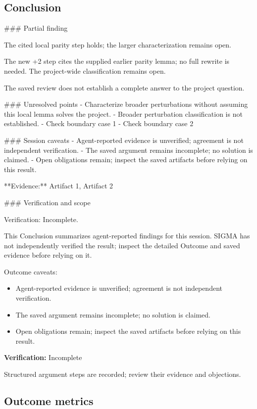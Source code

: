 \documentclass[11pt]{article}
\begin{document}
\subsection{Conclusion}
\#\#\# Partial finding

The cited local parity step holds; the larger characterization remains open.

The new +2 step cites the supplied earlier parity lemma; no full rewrite is needed. The project-wide classification remains open.

The saved review does not establish a complete answer to the project question.

\#\#\# Unresolved points
- Characterize broader perturbations without assuming this local lemma solves the project.
- Broader perturbation classification is not established.
- Check boundary case 1
- Check boundary case 2

\#\#\# Session caveats
- Agent-reported evidence is unverified; agreement is not independent verification.
- The saved argument remains incomplete; no solution is claimed.
- Open obligations remain; inspect the saved artifacts before relying on this result.

**Evidence:** Artifact 1, Artifact 2

\#\#\# Verification and scope

Verification: Incomplete.

This Conclusion summarizes agent-reported findings for this session. SIGMA has not independently verified the result; inspect the detailed Outcome and saved evidence before relying on it.\par
Outcome caveats:\par
\begin{itemize}
\item Agent-reported evidence is unverified; agreement is not independent verification.
\item The saved argument remains incomplete; no solution is claimed.
\item Open obligations remain; inspect the saved artifacts before relying on this result.
\end{itemize}
\textbf{Verification:} Incomplete\par
Structured argument steps are recorded; review their evidence and objections.\par
\subsection{Outcome metrics}
\end{document}
